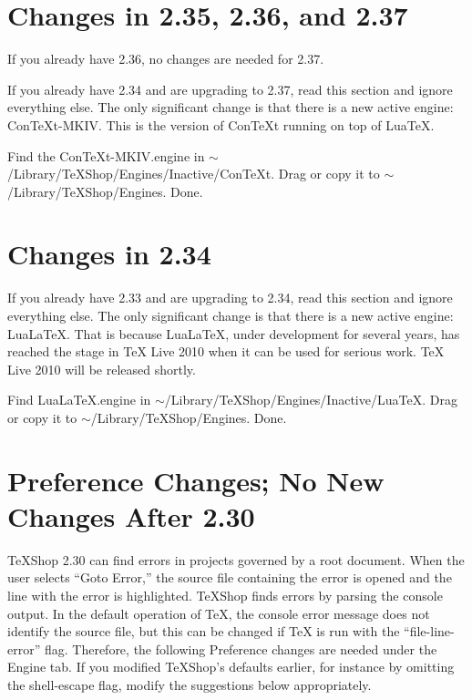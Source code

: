 \documentclass[11pt, oneside]{amsart}
\begin{document}
\section{Changes in 2.35, 2.36, and 2.37}


If you already have 2.36, no changes are needed for 2.37.

If you already have 2.34 and are upgrading to 2.37, read this section and ignore everything else. The only significant change is that there is a new active engine: ConTeXt-MKIV. This is the version of ConTeXt running on top of LuaTeX.

Find the ConTeXt-MKIV.engine in $\sim$/Library/TeXShop/Engines/Inactive/ConTeXt. Drag or copy it to $\sim$/Library/TeXShop/Engines. Done.


\section{Changes in 2.34}

If you already have 2.33 and are upgrading to 2.34, read this section and ignore everything else. The only significant change is that there is a new active engine: LuaLaTeX. That is because LuaLaTeX, under development for several years, has reached the stage in TeX Live 2010 when it can be used for serious work. TeX Live 2010 will be released shortly.

Find LuaLaTeX.engine in $\sim$/Library/TeXShop/Engines/Inactive/LuaTeX. Drag or copy it to $\sim$/Library/TeXShop/Engines. Done.

\section{Preference Changes;  No New Changes After 2.30}

TeXShop 2.30 can find errors in projects governed by a root document. When the user selects ``Goto Error,'' the source file containing the error is opened and the line with the error is highlighted. TeXShop finds errors by parsing the console output. In the default operation of TeX, the console error message does not identify the source file, but this can be changed if TeX is run with the ``file-line-error'' flag. Therefore, the following Preference changes are needed under the Engine tab. If you modified TeXShop's defaults earlier, for instance by omitting the shell-escape flag, modify the suggestions below appropriately.
\end{document}
